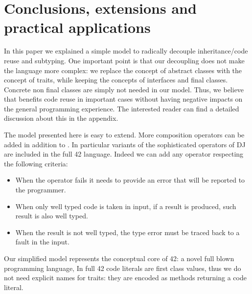 \saveSpace\saveSpace
\section{Conclusions, extensions and practical applications}
\saveSpace
In this paper we explained a simple model to 
radically decouple inheritance/code reuse and subtyping.
One important point is that our decoupling does not
make the language more complex:
we replace the concept of abstract classes with
the concept of traits, while keeping the concepts of
interfaces and final classes.
Concrete non final classes are simply not needed in our model.
Thus, we believe that \name benefits
code reuse in important cases 
without having negative impacts on the general programming experience.
The interested reader can find a detailed discussion about this in the appendix.


The model presented here is easy to extend.
More composition operators can be added in addition to \use.
In particular variants of the sophisticated operators of DJ are
included in the full 42 language.
 Indeed we can add any operator respecting the following criteria:

\begin{itemize}
\item When the operator fails it needs to provide an error that will be reported to the programmer.
\item When only well typed code is taken in input, if a result is produced,
 such result is also well typed.
\item When the result is not well typed,
the type error must be traced back to
a fault in the input.
 \end{itemize}
 

Our simplified model represents the conceptual core of  42: a novel full blown programming language,
In full 42 code literals are first class values, thus we
do not need explicit names
for traits: they are encoded as methods
 returning a code literal.

\begin{comment}
using the ideas presented in this paper to obtain reliable and understandable metaprogramming.
Formalization (in progress) for full 42 can be found at
\url{http://}\footnote{Omitted for anonymous review}. 
42 extends our model allowing
flattening to execute arbitrary computations.
In such model we do not need an explicit notion of traits: they are encoded as methods returning a code literal.
42 also has features less related to code composition, like
  a strong type system supporting aliasing mutability and circularity control,
   checked exceptions, and errors (unchecked exceptions) with strong-exception-safety.


42 do not have a finite set of composition operators; they can be
added using the built in support for native method calls. They can
be dynamically checked to verify that they are well behaved
according to our predicate, or they can be trusted to achieve
efficiency.
\end{comment}

